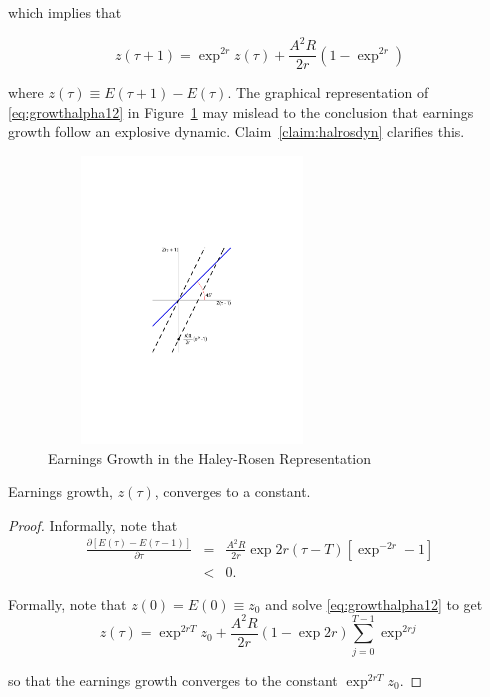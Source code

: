 \noindent which implies that

\begin{equation}
z(\tau + 1) = \exp^{2r} z(\tau) + \frac{A^2 R}{2r} \left( 1 - \exp^{2r} \right) \label{eq:growthalpha12}
\end{equation}

\noindent where $z(\tau) \equiv  E(\tau + 1) - E(\tau)$. The graphical representation of \eqref{eq:growthalpha12} in Figure~\ref{fig:halrosgrowth} may mislead to the conclusion that earnings growth follow an explosive dynamic. Claim~\ref{claim:halrosdyn} clarifies this. 

\begin{center}
\begin{figure}[H]
\caption{Earnings Growth in the Haley-Rosen Representation} \label{fig:halrosgrowth}
\centering
\includegraphics[width=3in, height=3in]{Figures/fig-explode-converge.pdf}
\floatfoot{\begin{small}
\end{small}}
\end{figure}
\end{center}

\begin{claim} \label{claim:halrosdyn}
Earnings growth, $z(\tau)$, converges to a constant.
\end{claim}

\begin{proof}
Informally, note that
\begin{eqnarray}
\frac{\partial \left[ E(\tau) - E(\tau - 1) \right] }{\partial \tau} &=& \frac{A^2 R}{2r} \exp{2r(\tau - T)} \left[ \exp^{-2r} - 1 \right] \nonumber \\
&<& 0.
\end{eqnarray}

\noindent Formally, note that $z(0) = E(0) \equiv z_{0}$ and solve \eqref{eq:growthalpha12} to get
\begin{equation}
z(\tau) = \exp^{2rT} z_{0} + \frac{A^2 R}{2r} \left( 1 - \exp{2r} \right) \sum \limits _{j=0} ^{T-1} \exp^{2rj}
\end{equation}

\noindent so that the earnings growth converges to the constant $\exp^{2rT} z_{0}$.
\end{proof}

